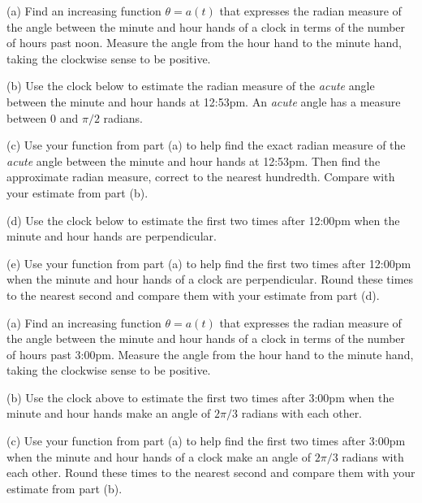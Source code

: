 \documentclass{ximera}
\begin{document}
\begin{question}   \label{Q54: Angles4544}
(a) Find an increasing function $\theta = a(t)$ that expresses the radian measure of the angle between the minute and hour hands of a clock in terms of the number of hours past noon. Measure the angle from the hour hand to the minute hand, taking the clockwise sense to be positive. %

(b) Use the clock below to estimate the radian measure of the \emph{acute} angle between the minute and hour hands at 12:53pm. An \emph{acute} angle has a measure between $0$ and $\pi/2$ radians.

(c) Use your function from part (a) to help find the exact radian measure of the \emph{acute} angle between the minute and hour hands at 12:53pm. Then find the approximate radian measure, correct to the nearest hundredth. Compare with your estimate from part (b).

(d) Use the clock below to estimate the first two times after 12:00pm when the minute and hour hands are perpendicular.

(e) Use your function from part (a) to help find the first two times after 12:00pm when the minute and hour hands of a clock are perpendicular. Round these times to the nearest second and compare them with your estimate from part (d).

 
\begin{onlineOnly}
    \begin{center}
\end{center}
\end{onlineOnly}

\end{question}


\begin{question}   \label{Q54B:Angles23434}
(a) Find an increasing function $\theta = a(t)$ that expresses the radian measure of the angle between the minute and hour hands of a clock in terms of the number of hours past 3:00pm. Measure the angle from the hour hand to the minute hand, taking the clockwise sense to be positive. %

(b) Use the clock above to estimate the first two times after 3:00pm when the minute and hour hands make an angle of $2\pi/3$ radians with each other.

(c) Use your function from part (a) to help find the first two times after 3:00pm when the minute and hour hands of a clock make an angle of $2\pi/3$ radians with each other. Round these times to the nearest second and compare them with your estimate from part (b).

\end{question}
\end{document}

